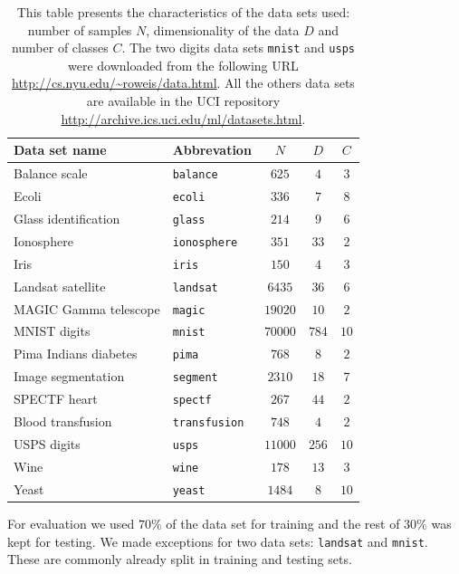 \begin{table}%
  \centering
    \begin{tabular}{l l c c c} \toprule
	Data set name&Abbrevation&$N$&$D$&$C$\\ 
	\midrule
	Balance scale&\texttt{balance}&$625$&$4$&$3$\\ 
	Ecoli&\texttt{ecoli}&$336$&$7$&$8$\\ 
	Glass identification&\texttt{glass}&$214$&$9$&$6$\\ 
	Ionosphere&\texttt{ionosphere}&$351$&$33$&$2$\\ 
	Iris&\texttt{iris}&$150$&$4$&$3$\\ 
	Landsat satellite&\texttt{landsat}&$6435$&$36$&$6$\\ 
	MAGIC Gamma telescope&\texttt{magic}&$19020$&$10$&$2$\\ 
	MNIST digits&\texttt{mnist}&$70000$&$784$&$10$\\ 
	Pima Indians diabetes&\texttt{pima}&$768$&$8$&$2$\\ 
	Image segmentation&\texttt{segment}&$2310$&$18$&$7$\\ 
	SPECTF heart&\texttt{spectf}&$267$&$44$&$2$\\ 
	Blood transfusion&\texttt{transfusion}&$748$&$4$&$2$\\ 
	USPS digits&\texttt{usps}&$11000$&$256$&$10$\\ 
	Wine&\texttt{wine}&$178$&$13$&$3$\\ 
	Yeast&\texttt{yeast}&$1484$&$8$&$10$\\  
      \bottomrule
    \end{tabular}
    \caption{\small \small This table presents the characteristics of the data sets used: number of samples $N$, dimensionality of the data $D$ and number of classes $C$. The two digits data sets \texttt{mnist} and \texttt{usps} were downloaded from the following URL \protect\url{http://cs.nyu.edu/~roweis/data.html}. All the others data sets are available in the UCI repository \protect\url{http://archive.ics.uci.edu/ml/datasets.html}.}
    \label{tab:datasets}
\end{table}

For evaluation we used $70\%$ of the data set for training and the rest of $30\%$ was kept for testing. We made exceptions for two data sets: \texttt{landsat} and \texttt{mnist}. These are commonly already split in training and testing sets.

